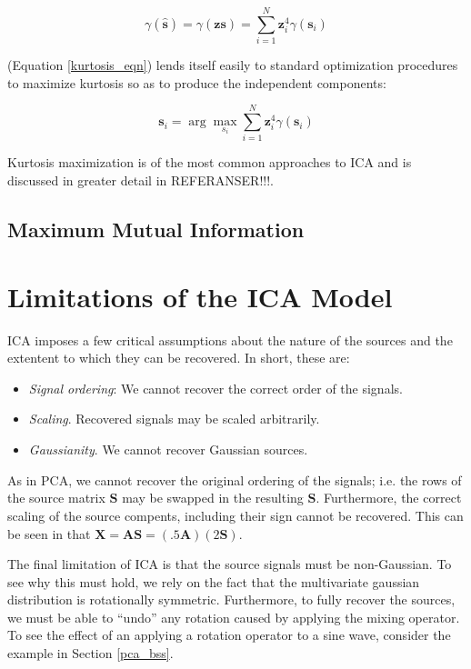 \documentclass[11pt, oneside, a4paper]{report}
\begin{document}
\begin{equation}
  \label{kurtosis_eqn}
  \gamma(\hat{\boldsymbol{s}}) = \gamma(\boldsymbol{z}\boldsymbol{s})
  = \sum_{i=1}^N \boldsymbol{z}_i^4\gamma(\boldsymbol{s}_i)
\end{equation}

(Equation \ref{kurtosis_eqn}) lends itself easily to standard optimization
procedures to maximize kurtosis so as to produce the independent components:

\begin{equation}
  \boldsymbol{s}_i = \arg \max_{s_i} \sum_{i=1}^N \boldsymbol{z}_i^4\gamma(\boldsymbol{s}_i)  
\end{equation}

Kurtosis maximization is of the most common approaches to ICA and is discussed
in greater detail in REFERANSER!!!.


\subsection{Maximum Mutual Information}




\section{Limitations of the ICA Model}\label{ICA_restrictions}

ICA imposes a few critical assumptions about the nature of the sources
and the extentent to which they can be recovered. In short, these are:


\begin{itemize}
  \item \emph{Signal ordering}: We cannot recover the correct order of
    the signals.
  \item \emph{Scaling}. Recovered signals may be scaled arbitrarily.
  \item \emph{Gaussianity}. We cannot recover Gaussian sources.
\end{itemize}


As in PCA, we cannot
recover the original ordering of the signals; i.e. the rows of the
source matrix $\boldsymbol{S}$ may be swapped in the resulting
$\hat{\boldsymbol{S}}$. Furthermore, the correct scaling of the source
compents, including their sign cannot be recovered. This can be seen
in that $\boldsymbol{X} = \boldsymbol{A}\boldsymbol{S} = (.5
\boldsymbol{A})(2 \boldsymbol{S})$.

The final limitation of ICA is that the source signals must be
non-Gaussian. To see why this must hold, we rely on the fact that the
multivariate gaussian distribution is rotationally symmetric. Furthermore,
to fully recover the sources, we must be able to ``undo'' any rotation
caused by applying the mixing operator. To see the effect of an
applying a rotation operator to a sine wave, consider the example in
Section \ref{pca_bss}.
\end{document}
